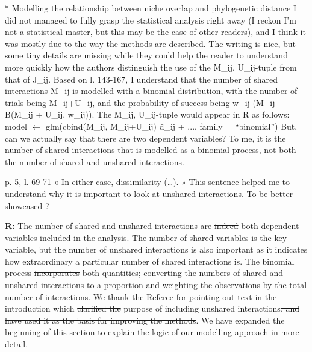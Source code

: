 \documentclass[12pt]{letter}
\newenvironment{refquote}{\bigskip \begin{it}}{\end{it}\smallskip}
\providecommand{\DIFadd}[1]{{\protect\color{blue}\uwave{#1}}} %
\providecommand{\DIFdel}[1]{{\protect\color{red}\sout{#1}}}                      %
\providecommand{\DIFaddbegin}{} %
\providecommand{\DIFaddend}{} %
\providecommand{\DIFdelbegin}{} %
\providecommand{\DIFdelend}{} %
\newcommand{\DIFscaledelfig}{0.5}
\newlength{\DIFdelgraphicswidth} %
\newlength{\DIFdelgraphicsheight} %
\newcommand{\DIFaddincludegraphics}[2][]{{\color{blue}\fbox{\DIFOincludegraphics[#1]{#2}}}} %
\newcommand{\DIFdelincludegraphics}[2][]{%
\sbox{\DIFdelgraphicsbox}{\DIFOincludegraphics[#1]{#2}}%
\settoboxwidth{\DIFdelgraphicswidth}{\DIFdelgraphicsbox} %
\settoboxtotalheight{\DIFdelgraphicsheight}{\DIFdelgraphicsbox} %
\scalebox{\DIFscaledelfig}{%
\parbox[b]{\DIFdelgraphicswidth}{\usebox{\DIFdelgraphicsbox}\\[-\baselineskip] \rule{\DIFdelgraphicswidth}{0em}}\llap{\resizebox{\DIFdelgraphicswidth}{\DIFdelgraphicsheight}{%
\setlength{\unitlength}{\DIFdelgraphicswidth}%
\begin{picture}(1,1)%
\thicklines\linethickness{2pt} %
{\color[rgb]{1,0,0}\put(0,0){\framebox(1,1){}}}%
{\color[rgb]{1,0,0}\put(0,0){\line( 1,1){1}}}%
{\color[rgb]{1,0,0}\put(0,1){\line(1,-1){1}}}%
\end{picture}%
}\hspace*{3pt}}} %
} %
\DeclareRobustCommand{\DIFaddbegin}{\DIFOaddbegin \let\includegraphics\DIFaddincludegraphics} %
\DeclareRobustCommand{\DIFaddend}{\DIFOaddend \let\includegraphics\DIFOincludegraphics} %
\DeclareRobustCommand{\DIFdelbegin}{\DIFOdelbegin \let\includegraphics\DIFdelincludegraphics} %
\DeclareRobustCommand{\DIFdelend}{\DIFOaddend \let\includegraphics\DIFOincludegraphics} %
\begin{document}
	\begin{refquote}
		* Modelling the relationship between niche overlap and phylogenetic distance
		\DIFdelbegin %
\DIFdelend I did not managed to fully grasp the statistical analysis right away (I reckon I'm not a statistical master, but this may be the case of other readers), and I think it was mostly due to the way the methods are described. The writing is nice, but some tiny details are missing while they could help the reader to understand more quickly how the authors distinguish the use of the {M\_ij, U\_ij}-tuple from that of J\_ij.
		Based on l. 143-167, I understand that the number of shared interactions M\_ij is modelled with a binomial distribution, with the number of trials being M\_ij+U\_ij, and the probability of success being w\_ij (M\_ij ~ B(M\_ij + U\_ij, w\_ij)). The {M\_ij, U\_ij}-tuple would appear in R as follows:
		model $\leftarrow$ glm(cbind(M\_ij, M\_ij+U\_ij) \~ d\_ij + ..., family = “binomial”)
		But, can we actually say that there are two dependent variables? To me, it is the number of shared interactions that is modelled as a binomial process, not both the number of shared and unshared interactions.

		\smallskip

		p. 5, l. 69-71 « In either case, dissimilarity (…). » This sentence helped me to understand why it is important to look at unshared interactions. To be better showcased ?

	\end{refquote}


	\textbf{R:} The number of shared and unshared interactions are \DIFdelbegin \DIFdel{indeed }\DIFdelend both dependent variables included in the analysis. The number of shared variables is \DIFaddbegin \DIFadd{indeed }\DIFaddend the key variable, but the number of unshared interactions is also important as it indicates how extraordinary a particular number of shared interactions is. The binomial process \DIFdelbegin \DIFdel{incorporates }\DIFdelend \DIFaddbegin \DIFadd{incorportates }\DIFaddend both quantities; converting the numbers of shared and unshared interactions to a proportion and weighting the observations by the total number of interactions. We thank the Referee for pointing out text in the introduction which \DIFdelbegin \DIFdel{clarified the }\DIFdelend \DIFaddbegin \DIFadd{clarifiedthe }\DIFaddend purpose of including unshared interactions\DIFdelbegin \DIFdel{, and have used it as the basis for improving the methods}\DIFdelend . We have expanded the beginning of this section to explain the logic of our modelling approach in more detail.
\end{document}
